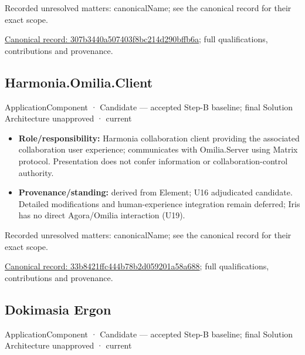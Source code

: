 {\small Recorded unresolved matters: canonicalName; see the canonical record for their exact scope.}\par
{\footnotesize \href{../../../../continuum/application/application-component/307b3440a507403f8bc214d290bffb6a.md}{Canonical record: 307b3440a507403f8bc214d290bffb6a}; full qualifications, contributions and provenance.}\par
\subsection{Harmonia.Omilia.Client}

\label{element:33b8421ffc444b78b2d059201a58a688}
{\small ApplicationComponent · Candidate — accepted Step-B baseline; final Solution Architecture unapproved · current}\par

\begin{itemize}


\item \textbf{Role/responsibility:} Harmonia collaboration client providing the associated
  collaboration user experience; communicates with Omilia.Server using Matrix
  protocol. Presentation does not confer information or collaboration-control
  authority.

\item \textbf{Provenance/standing:} derived from Element; U16 adjudicated candidate.
  Detailed modifications and human-experience integration remain deferred;
  Iris has no direct Agora/Omilia interaction (U19).

\end{itemize}

{\small Recorded unresolved matters: canonicalName; see the canonical record for their exact scope.}\par
{\footnotesize \href{../../../../continuum/application/application-component/33b8421ffc444b78b2d059201a58a688.md}{Canonical record: 33b8421ffc444b78b2d059201a58a688}; full qualifications, contributions and provenance.}\par
\subsection{Dokimasia Ergon}

\label{element:34d7c844da3344a09e96ad821ff9fcea}
{\small ApplicationComponent · Candidate — accepted Step-B baseline; final Solution Architecture unapproved · current}\par

